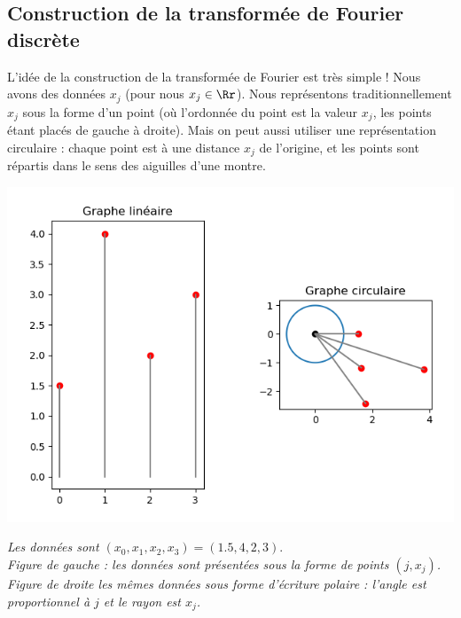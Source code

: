 \documentclass[11pt,class=report,crop=false]{standalone}
\begin{document}
\subsection{Construction de la transformée de Fourier discrète}

L'idée de la construction de la transformée de Fourier est très simple !
Nous avons des données $x_j$ (pour nous $x_j \in \Rr$). Nous représentons traditionnellement $x_j$ sous la forme d'un point (où l'ordonnée du point est la valeur $x_j$, les points étant placés de gauche à droite). Mais on peut aussi utiliser une représentation circulaire : chaque point est à une distance $x_j$ de l'origine, et les points sont répartis dans le sens des aiguilles d'une montre. 


\begin{center}
\includegraphics[scale=\myscale,scale=0.7]{figures/fourier-2}

\nopagebreak

\begin{minipage}{0.8\textwidth}
\center\emph{
Les données sont $(x_0,x_1,x_2,x_3) = (1.5,4,2,3).$\\
Figure de gauche : les données sont présentées sous la forme de points $(j,x_j)$.\\
Figure de droite les mêmes données sous forme d'écriture polaire : l'angle est proportionnel à $j$ et le rayon est $x_j$.}
\end{minipage}

\end{center}
\end{document}
